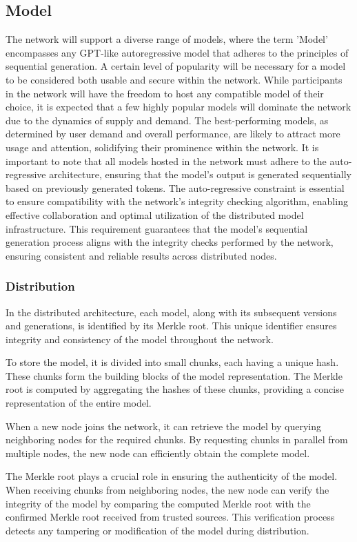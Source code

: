 \documentclass{article}
\begin{document}
\subsection{Model}
The network will support a diverse range of models, where the term 'Model' encompasses any GPT-like autoregressive model that adheres to the principles of sequential generation. 
A certain level of popularity will be necessary for a model to be considered both usable and secure within the network. 
While participants in the network will have the freedom to host any compatible model of their choice, it is expected that a few highly popular models will dominate the network due to the dynamics of supply and demand. 
The best-performing models, as determined by user demand and overall performance, are likely to attract more usage and attention, solidifying their prominence within the network. 
It is important to note that all models hosted in the network must adhere to the auto-regressive architecture, ensuring that the model's output is generated sequentially based on previously generated tokens. 
The auto-regressive constraint is essential to ensure compatibility with the network's integrity checking algorithm, enabling effective collaboration and optimal utilization of the distributed model infrastructure. 
This requirement guarantees that the model's sequential generation process aligns with the integrity checks performed by the network, ensuring consistent and reliable results across distributed nodes.

\subsubsection{Distribution}
In the distributed architecture, each model, along with its subsequent versions and generations, is identified by its Merkle root. 
This unique identifier ensures integrity and consistency of the model throughout the network.

To store the model, it is divided into small chunks, each having a unique hash. 
These chunks form the building blocks of the model representation. 
The Merkle root is computed by aggregating the hashes of these chunks, providing a concise representation of the entire model.

When a new node joins the network, it can retrieve the model by querying neighboring nodes for the required chunks. 
By requesting chunks in parallel from multiple nodes, the new node can efficiently obtain the complete model.

The Merkle root plays a crucial role in ensuring the authenticity of the model. 
When receiving chunks from neighboring nodes, the new node can verify the integrity of the model by comparing the computed Merkle root with the confirmed Merkle root received from trusted sources. 
This verification process detects any tampering or modification of the model during distribution.
\end{document}
